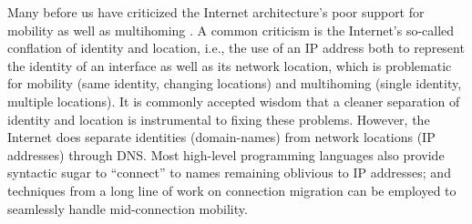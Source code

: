 

Many before us have criticized the Internet architecture's poor support for mobility as well as multihoming \cite{HIP,LISP,HAIR,MobilityFirst}. A common criticism is the Internet's so-called conflation of identity and location, i.e., the use of an IP address both to represent the identity of an interface as well as its network location, which is problematic for mobility (same identity, changing locations) and multihoming (single identity, multiple locations). It is commonly accepted wisdom that a cleaner separation of identity and location is instrumental to fixing these problems. However, the Internet does separate identities (domain-names) from network locations (IP addresses) through DNS. Most high-level programming languages also provide syntactic sugar to ``connect'' to names remaining oblivious to IP addresses; and %
techniques from a long line of work on connection migration can be employed to seamlessly handle mid-connection mobility.

